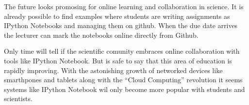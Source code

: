 \documentclass[11pt, a4paper]{article}  %
\begin{document}
\begin{multicols}{2}
The future looks promosing for online learning and collaboration in science.
It is already possible to find examples where students are writing assignments
as IPython Notebooks and managing them on github. When the due date arrives
the lecturer can mark the notebooks online directly from Github. \cite{brown2}

Only time will tell if the scientific comunity embraces online collaboration
with tools like IPython Notebook. But is safe to say that this area of
education is rapidly improving. With the astonishing growth of networked
devices like smarthpones and tablets along with the ``Cloud Computing''
revolution it seems systems like IPython Notebook wil only become more popular
with students and scientists.

\end{multicols}



\end{document}
